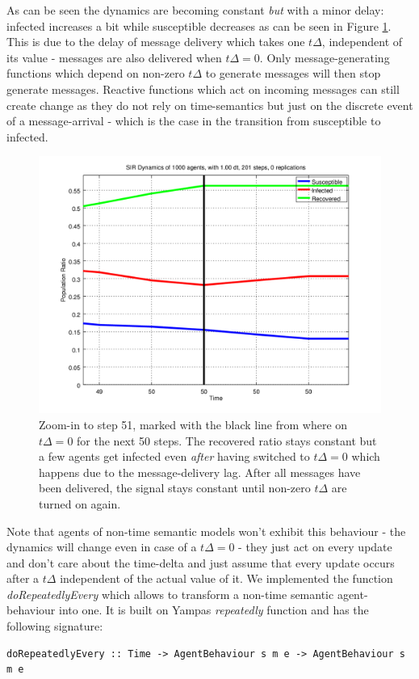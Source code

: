As can be seen  the dynamics are becoming constant \textit{but} with a minor delay: infected increases a bit while susceptible decreases as can be seen in Figure \ref{fig:sir_abs_zero_dt_zoom}. This is due to the delay of message delivery which takes one $t\Delta$, independent of its value - messages are also delivered when $t\Delta = 0$. Only message-generating functions which depend on non-zero $t\Delta$ to generate messages will then stop generate messages. Reactive functions which act on incoming messages can still create change as they do not rely on time-semantics but just on the discrete event of a message-arrival - which is the case in the transition from susceptible to infected.

\begin{figure}
	\centering
	\includegraphics[width=.4\textwidth, angle=0]{./../shared/fig/SIR_ABS_zeroDt_mid_zoom.png}
	\caption{Zoom-in to step 51, marked with the black line from where on $t\Delta = 0$ for the next 50 steps. The recovered ratio stays constant but a few agents get infected even \textit{after} having switched to $t\Delta = 0$ which happens due to the message-delivery lag. After all messages have been delivered, the signal stays constant until non-zero $t\Delta$ are turned on again.}
	\label{fig:sir_abs_zero_dt_zoom}
\end{figure}

Note that agents of non-time semantic models won't exhibit this behaviour - the dynamics will change even in case of a $t\Delta = 0$ - they just act on every update and don't care about the time-delta and just assume that every update occurs after a $t\Delta$ independent of the actual value of it. We implemented the function \textit{doRepeatedlyEvery} which allows to transform a non-time semantic agent-behaviour into one. It is built on Yampas \textit{repeatedly} function and has the following signature:

\begin{verbatim}
doRepeatedlyEvery :: Time -> AgentBehaviour s m e -> AgentBehaviour s m e
\end{verbatim}

